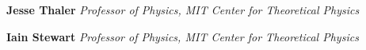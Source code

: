 %
%


\NewDocumentCommand{}

\NewDocumentCommand{}


\begin{flushright}



\textbf{Jesse Thaler}
\vspace{-19pt}
\vspace{-5pt}
{\itshape
Professor of Physics, MIT Center for Theoretical Physics
}
\end{flushright}

\vspace{-10pt}

\begin{flushright}

\textbf{Iain Stewart}
\vspace{-19pt}
\vspace{-5pt}
{\itshape
Professor of Physics, MIT Center for Theoretical Physics
\\[18pt]
}
\end{flushright}


